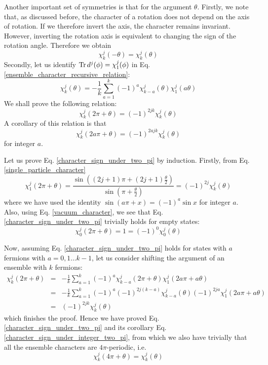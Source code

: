 \documentclass[12pt]{article}
\begin{document}
	Another important set of symmetries is that for the argument $\theta$. Firstly, we note that, as discussed before, the character of a rotation does not depend on the axis of rotation. If we therefore invert the axis, the character remains invariant. However, inverting the rotation axis is equivalent to changing the sign of the rotation angle. Therefore we obtain
	\begin{equation} \label{flip_angle_sign}
	\chi^j_k(-\theta)=\chi^j_k(\theta)
	\end{equation}
	Secondly, let us identify $\Tr d^j(\phi)=\chi^j_1(\phi)$ in Eq. \ref{ensemble_character_recursive_relation}:
	\begin{equation}
	\chi^j_k(\theta)=-\frac{1}{k}\sum_{a=1}^k (-1)^{a}\chi^j_{k-a}(\theta)\chi^j_1(a\theta)
	\end{equation}
	We shall prove the following relation:
	\begin{equation} \label{character_sign_under_two_pi}
	\chi^j_k(2\pi+\theta)=(-1)^{2jk}\chi^j_k(\theta)
	\end{equation}
	A corollary of this relation is that
	\begin{equation} \label{character_sign_under_integer_two_pi}
	\chi^j_k(2a\pi+\theta)=(-1)^{2ajk}\chi^j_k(\theta)
	\end{equation}
	for integer $a$.
	
	Let us prove Eq. \ref{character_sign_under_two_pi} by induction. Firstly, from Eq. \ref{single_particle_character}
	\begin{equation}
	\chi^j_1(2\pi+\theta)=\frac{\sin((2j+1)\pi+(2j+1)\frac{\theta}{2})}{\sin(\pi +\frac{\theta}{2})}=(-1)^{2j}\chi^j_k(\theta)
	\end{equation}
	where we have used the identity $\sin(a\pi+x)=(-1)^a\sin{x}$ for integer $a$. Also, using Eq. \ref{vacuum_character}, we see that Eq. \ref{character_sign_under_two_pi} trivially holds for empty states:
	\begin{equation}
	\chi^j_0(2\pi+\theta)=1=(-1)^0\chi^j_0(\theta)
	\end{equation}
	
	Now, assuming Eq. \ref{character_sign_under_two_pi} holds for states with $a$ fermions with $a=0,1\dots k-1$, let us consider shifting the argument of an ensemble with $k$ fermions:
	\begin{eqnarray*}
	\chi^j_k(2\pi+\theta)&=&-\frac{1}{k}\sum_{a=1}^k (-1)^{a}\chi^j_{k-a}(2\pi+\theta)\chi^j_1(2a\pi+a\theta)\\
	&=&-\frac{1}{k}\sum_{a=1}^k (-1)^{a}(-1)^{2j(k-a)}\chi^j_{k-a}(\theta)(-1)^{2ja}\chi^j_1(2a\pi+a\theta)\\
	&=&(-1)^{2jk}\chi^j_k(\theta)
	\end{eqnarray*}
	which finishes the proof. Hence we have proved Eq. \ref{character_sign_under_two_pi} and its corollary Eq. \ref{character_sign_under_integer_two_pi}, from which we also have trivially that all the ensemble characters are $4\pi$-periodic, i.e.
	\begin{equation} \label{character_four_pi_periodic}
	\chi^j_k(4\pi+\theta)=\chi^j_k(\theta)
	\end{equation}
	
\end{document}
